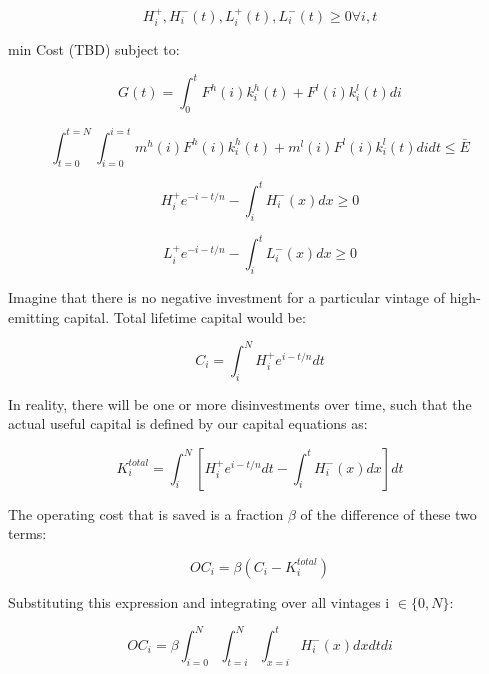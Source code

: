 \documentclass{easychithesis}
\begin{document}
\begin{equation}
H^+_i, H^-_i(t), L^+_i(t), L^-_i(t) \geq 0 \forall i, t
\end{equation}

min Cost (TBD) subject to:

\begin{equation}
G(t) = \int_0^t F^h(i)k_i^h(t) + F^l(i)k_i^l(t) di
\end{equation}

\begin{equation}
\int_{t=0}^{t=N}\int_{i=0}^{i=t} m^h(i)F^h(i)k_i^h(t) + m^l(i)F^l(i)k_i^l(t) di dt \leq \bar{E}
\end{equation}

\begin{equation}
H_i^+ e^{-i-t/n} - \int_i^t H^-_i(x)dx \geq 0
\end{equation}

\begin{equation}
L_i^+ e^{-i-t/n} - \int_i^t L^-_i(x)dx \geq 0
\end{equation}



Imagine that there is no negative investment for a particular vintage of high-emitting capital. Total lifetime capital would be:

\begin{equation}
C_i = \int_i^N H^+_i e^{i-t/n}dt
\end{equation}

In reality, there will be one or more disinvestments over time, such that the actual useful capital is defined by our capital equations as:

\begin{equation}
K^{total}_i = \int_i^N \left[H^+_i e^{i-t/n} dt - \int_i^t H^-_i(x)dx \right] dt
\end{equation}

The operating cost that is saved is a fraction $\beta$ of the difference of these two terms:

\begin{equation}
OC_i = \beta (C_i - K^{total}_i)
\end{equation}


Substituting this expression and integrating over all vintages  i $\in \{0,N\}$:

\begin{equation}
OC_i = \beta \int_{i=0}^N \int_{t=i}^N \int_{x=i}^t H^-_i(x) dx dt di
\end{equation}
\end{document}
